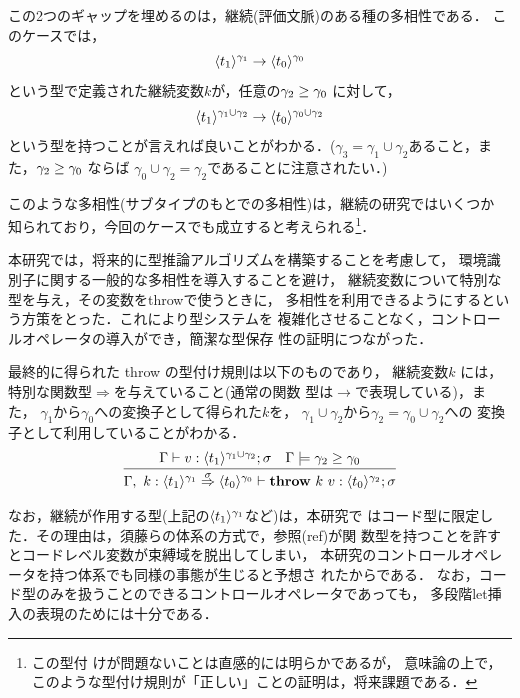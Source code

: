 この2つのギャップを埋めるのは，継続(評価文脈)のある種の多相性である．
このケースでは，
\[\langle{t_1}\rangle^{\gamma_1} \to \langle{t_0}\rangle^{\gamma_0} \]
という型で定義された継続変数$k$が，任意の$\gamma_2 \ge \gamma_0$ に対して，
\[\langle{t_1}\rangle^{\gamma_1 \cup \gamma_2} \to \langle{t_0}\rangle^{\gamma_0 \cup \gamma_2} \]
という型を持つことが言えれば良いことがわかる．($\gamma_3 = \gamma_1
\cup \gamma_2$あること，また，$\gamma_2 \ge \gamma_0$ ならば
$\gamma_0 \cup \gamma_2 = \gamma_2$であることに注意されたい．)

このような多相性(サブタイプのもとでの多相性)は，継続の研究ではいくつか
知られており，今回のケースでも成立すると考えられる\footnote{この型付
  けが問題ないことは直感的には明らかであるが，
  意味論の上で，このような型付け規則が「正しい」ことの証明は，将来課題である．}．

本研究では，将来的に型推論アルゴリズムを構築することを考慮して，
環境識別子に関する一般的な多相性を導入することを避け，
継続変数について特別な型を与え，その変数をthrowで使うときに，
多相性を利用できるようにするという方策をとった．これにより型システムを
複雑化させることなく，コントロールオペレータの導入ができ，簡潔な型保存
性の証明につながった．

最終的に得られた throw の型付け規則は以下のものであり，
継続変数$k$ には，特別な関数型$\Rightarrow$を与えていること(通常の関数
型は$\rightarrow$で表現している)，また，
$\gamma_1$から$\gamma_0$への変換子として得られた$k$を，
$\gamma_1\cup \gamma_2$から$\gamma_2 = \gamma_0 \cup \gamma_2$への
変換子として利用していることがわかる．
\[
  \infer
  {\Gamma,~k:\contT{\codeT{t_1}{\gamma_1}}{\codeT{t_0}{\gamma_0}}{\sigma}
    \vdash \throw{k}{v} : \codeT{t_0}{\gamma_2} ; \sigma}
  {\Gamma
    \vdash v : \codeT{t_1}{\gamma_1 \cup \gamma_2} ; \sigma
    & \Gamma \models \gamma_2 \ord \gamma_0
  }
\]

なお，継続が作用する型(上記の$\langle{t_1}\rangle^{\gamma_1}$など)は，本研究で
はコード型に限定した．その理由は，須藤らの体系の方式で，参照(ref)が関
数型を持つことを許すとコードレベル変数が束縛域を脱出してしまい，
本研究のコントロールオペレータを持つ体系でも同様の事態が生じると予想さ
れたからである．
なお，コード型のみを扱うことのできるコントロールオペレータであっても，
多段階let挿入の表現のためには十分である．

